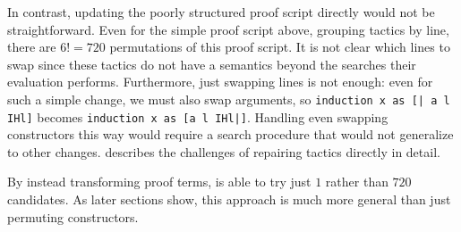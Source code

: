 In contrast, updating the poorly structured proof script directly would not be straightforward.
Even for the simple proof script above, grouping tactics by line, there are $6! = 720$ permutations of this proof script.
It is not clear which lines to swap since these tactics do not have a semantics beyond the searches their evaluation performs.
Furthermore, just swapping lines is not enough: even for such a simple change, we must also swap
arguments, so \lstinline{induction x as [| a l IHl]} becomes \lstinline{induction x as [a l IHl|]}.
Handling even swapping constructors this way would require a search procedure that would not generalize to other changes.
\citet{robert2018} describes the challenges of repairing tactics directly in detail.

By instead transforming proof terms, \toolname is able to try just $1$ rather than $720$ candidates.
As later sections show, this approach is much more general than just permuting constructors.



